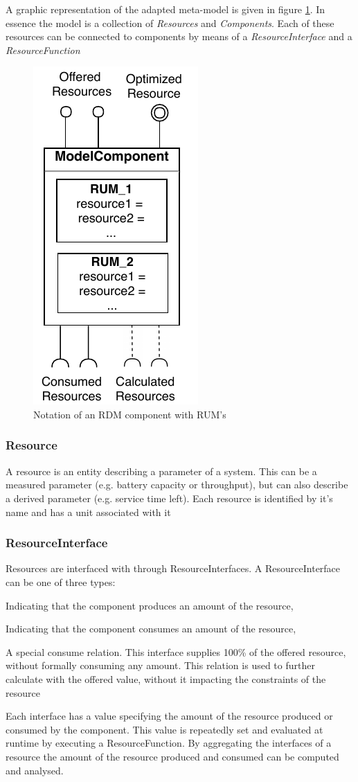 A graphic representation of the adapted meta-model is given in figure \ref{fig:component}. In essence the model is a collection of \emph{Resources} and \emph{Components}. Each of these resources can be connected to components by means of a \emph{ResourceInterface} and a \emph{ResourceFunction}
\begin{figure}
\centering
  \includegraphics[width=0.3\linewidth]{resources/img/component.pdf}
  \caption{Notation of an RDM component with RUM's}
  \label{fig:component}
\end{figure}

\subsubsection{Resource}
A resource is an entity describing a parameter of a system. This can be a measured parameter (e.g. battery capacity or throughput), but can also describe a derived parameter (e.g. service time left). Each resource is identified by it's name and has a unit associated with it

\subsubsection{ResourceInterface}
Resources are interfaced with through ResourceInterfaces. A ResourceInterface can be one of three types:
\begin{description}
\nospace
\item[Offer] Indicating that the component produces an amount of the resource,
\item[Consume] Indicating that the component consumes an amount of the resource,
\item[Calculate] A special consume relation. This interface supplies 100\% of the offered resource, without formally consuming any amount. This relation is used to further calculate with the offered value, without it impacting the constraints of the resource%
\end{description}
Each interface has a value specifying the amount of the resource produced or consumed by the component. This value is repeatedly set and evaluated at runtime by executing a ResourceFunction. By aggregating the interfaces of a resource the amount of the resource produced and consumed can be computed and analysed.

